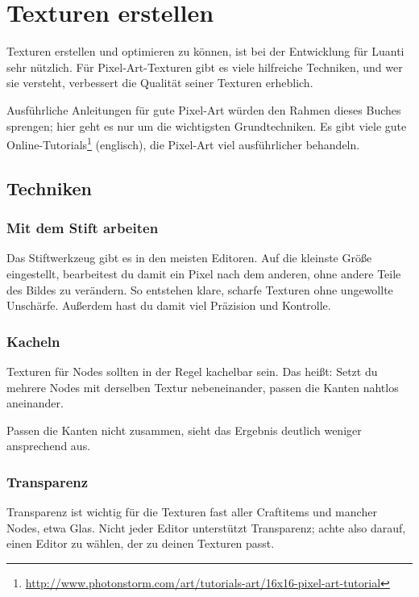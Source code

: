 \chapter{Texturen erstellen}
\label{ch:items/creating-textures}

Texturen erstellen und optimieren zu können, ist
bei der Entwicklung für Luanti sehr nützlich. Für Pixel-Art-Texturen
gibt es viele hilfreiche Techniken, und wer sie versteht, verbessert die
Qualität seiner Texturen erheblich.

Ausführliche Anleitungen für gute Pixel-Art würden den Rahmen dieses
Buches sprengen; hier geht es nur um die wichtigsten Grundtechniken. Es
gibt viele gute Online-Tutorials\footnote{\url{http://www.photonstorm.com/art/tutorials-art/16x16-pixel-art-tutorial}}
(englisch), die Pixel-Art viel ausführlicher behandeln.

\section{Techniken}\label{techniken}

\subsection{Mit dem Stift arbeiten}\label{mit-dem-stift-arbeiten}

Das Stiftwerkzeug gibt es in den meisten Editoren. Auf die kleinste
Größe eingestellt, bearbeitest du damit ein Pixel nach dem anderen, ohne
andere Teile des Bildes zu verändern. So entstehen klare, scharfe
Texturen ohne ungewollte Unschärfe. Außerdem hast du damit viel
Präzision und Kontrolle.

\subsection{Kacheln}\label{kacheln}

Texturen für Nodes sollten in der Regel kachelbar sein. Das heißt: Setzt
du mehrere Nodes mit derselben Textur nebeneinander, passen die Kanten
nahtlos aneinander.

Passen die Kanten nicht zusammen, sieht das Ergebnis deutlich weniger
ansprechend aus.

\subsection{Transparenz}\label{transparenz}

Transparenz ist wichtig für die Texturen fast aller
Craftitems und mancher Nodes, etwa Glas.
Nicht jeder Editor unterstützt Transparenz; achte also darauf, einen
Editor zu wählen, der zu deinen Texturen passt.

